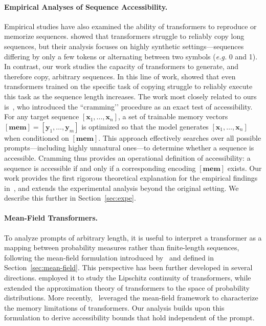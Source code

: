 \paragraph{Empirical Analyses of Sequence Accessibility.}
Empirical studies have also examined the ability of transformers to reproduce or memorize sequences. \citet{barbero2024transformers} showed that transformers struggle to reliably copy long sequences, but their analysis focuses on highly synthetic settings—sequences differing by only a few tokens or alternating between two symbols ({\it e.g.} 0 and 1).
In contrast, our work studies the capacity of transformers to generate, and therefore copy, arbitrary sequences. In this line of work, \citet{Jelassi2024RepeatAM} showed that even transformers trained on the specific task of copying struggle to reliably execute this task as the sequence length increases. The work most closely related to ours is~\citet{kuratov-etal-2025-cramming}, who introduced the “cramming’’ procedure as an exact test of accessibility. For any target sequence $[\mathbf{x}_1,\ldots,\mathbf{x}_n]$, a set of trainable memory vectors $[\mathbf{mem}]=[\mathbf{y}_1,\ldots,\mathbf{y}_m]$ is optimized so that the model generates $[\mathbf{x}_1,\ldots,\mathbf{x}_n]$ when conditioned on $[\mathbf{mem}]$. This approach effectively searches over all possible prompts—including highly unnatural ones—to determine whether a sequence is accessible. Cramming thus provides an operational definition of accessibility: a sequence is accessible if and only if a corresponding encoding $[\mathbf{mem}]$ exists. Our work provides the first rigorous theoretical explanation for the empirical findings in~\citet{kuratov-etal-2025-cramming}, and extends the experimental analysis beyond the original setting. We describe this further in Section~\ref{sec:expe}.

\paragraph{Mean-Field Transformers.}
To analyze prompts of arbitrary length, it is useful to interpret a transformer as a mapping between probability measures rather than finite-length sequences, following the mean-field formulation introduced by~\citet{pmlr-v151-sander22a} and defined in Section~\ref{sec:mean-field}. This perspective has been further developed in several directions. \citet{Castin_V_2024_p-icml_lipschitz} employed it to study the Lipschitz continuity of transformers, while~\citet{furuya2025transformers} extended the approximation theory of transformers to the space of probability distributions. More recently,~\citet{meyer2025memorylimitationsprompttuning} leveraged the mean-field framework to characterize the memory limitations of transformers. Our analysis builds upon this formulation to derive accessibility bounds that hold independent of the prompt.

